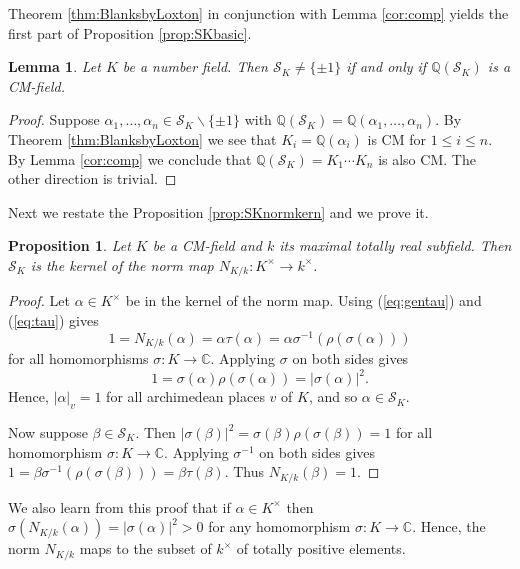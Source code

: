\documentclass[11pt]{amsart}
\newtheorem{lemma}{Lemma}[section]
\newtheorem{proposition}{Proposition}[section]
\numberwithin{equation}{eqncounter}
\def\IC{\mathbb C}
\def\IQ{\mathbb Q}
\newcommand{\Norm}{N_{K/k}}
\def\Sc{\mathcal{S}}
\begin{document}
Theorem \ref{thm:BlanksbyLoxton} in conjunction with Lemma \ref{cor:comp} yields the first part of Proposition \ref{prop:SKbasic}.
\begin{lemma}\label{lem:CMchar}
Let $K$ be a number field. Then $\Sc_K \neq \{\pm 1\}$
if and only if  $\IQ(\Sc_K)$  is a CM-field.   
\end{lemma}
\begin{proof}
Suppose $\alpha_1,\ldots,\alpha_n\in \Sc_K\backslash\{\pm 1\}$ with $\IQ(\Sc_K)=\IQ(\alpha_1,\ldots,\alpha_n)$. By Theorem \ref{thm:BlanksbyLoxton} we see that $K_i=\IQ(\alpha_i)$
is CM for $1\leq i\leq n$. By Lemma \ref{cor:comp} we conclude that $\IQ(\Sc_K)=K_1\cdots K_n$ is also CM. The other direction is trivial.
\end{proof}
 
 Next we restate the Proposition \ref{prop:SKnormkern} and we prove it.
\begin{proposition}\label{prop: normkern2}
Let $K$ be a CM-field and $k$ its maximal totally real subfield. Then $\Sc_K$ is the kernel of the norm map $\Norm:K^\times\to k^\times$.
\end{proposition}
\begin{proof}
Let $\alpha\in K^\times$ be in the kernel of the norm map. Using (\ref{eq:gentau}) and (\ref{eq:tau}) gives
$$1=\Norm(\alpha)=\alpha\tau(\alpha)=\alpha\sigma^{-1}(\rho(\sigma(\alpha)))$$
for all homomorphisms $\sigma: K \to \IC$.
Applying $\sigma$ on both sides gives 
$$1=\sigma(\alpha)\rho(\sigma(\alpha))=|\sigma(\alpha)|^2.$$ 
Hence, $|\alpha|_v=1$ for all archimedean places $v$ of $K$,
and so $\alpha\in \Sc_K$. 

Now suppose $\beta\in \Sc_K$. Then $|\sigma(\beta)|^2=\sigma(\beta)\rho(\sigma(\beta))=1$ for all homomorphism $\sigma: K \to \IC$.
Applying $\sigma^{-1}$ on both sides gives   $1=\beta\sigma^{-1}(\rho(\sigma(\beta)))=\beta\tau(\beta)$. Thus $\Norm(\beta)=1$.
\end{proof}
We also learn from this proof that if $\alpha\in K^\times$ then $\sigma(\Norm(\alpha))=|\sigma(\alpha)|^2>0$
for any  homomorphism $\sigma: K \to \IC$. Hence, the norm $\Norm$ maps to the subset of $k^\times$
of totally positive elements.
\end{document}
